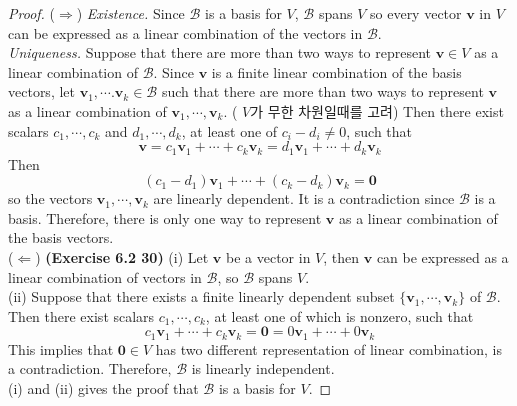 \begin{proof}
	($\Rightarrow$) \textit{Existence.} Since $\mathcal{B}$ is a basis for $V$, $\mathcal{B}$ spans $V$ so every vector $\textbf{v}$ in $V$ can be expressed as a linear combination of the vectors in $\mathcal{B}$. \\
	
	\textit{Uniqueness.} Suppose that there are more than two ways to represent $\textbf{v} \in V$ as a linear combination of $\mathcal{B}$. Since $\textbf{v}$ is a finite linear combination of the basis vectors, let $\textbf{v}_1, \cdots. \textbf{v}_k \in \mathcal{B}$ such that there are more than two ways to represent $\textbf{v}$ as a linear combination of $\textbf{v}_1, \cdots, \textbf{v}_k$. ({\color{blue} $V$가 무한 차원일때를 고려}) Then there exist scalars $c_1, \cdots, c_k$ and $d_1, \cdots, d_k$, at least one of $c_i - d_i \neq 0$, such that \begin{equation*}
		\textbf{v} = c_1\textbf{v}_1 + \cdots + c_k\textbf{v}_k = d_1\textbf{v}_1 + \cdots + d_k\textbf{v}_k
	\end{equation*} Then \begin{equation*}
		(c_1 - d_1)\textbf{v}_1 + \cdots + (c_k - d_k)\textbf{v}_k = \textbf{0}
	\end{equation*} so the vectors $\textbf{v}_1, \cdots, \textbf{v}_k$ are linearly dependent. It is a contradiction since $\mathcal{B}$ is a basis. Therefore, there is only one way to represent $\textbf{v}$ as a linear combination of the basis vectors. \\
	
	($\Leftarrow$) \textbf{(Exercise 6.2 30)} (i) Let $\textbf{v}$ be a vector in $V$, then $\textbf{v}$ can be expressed as a linear combination of vectors in $\mathcal{B}$, so $\mathcal{B}$ spans $V$. \\
	
	(ii) Suppose that there exists a finite linearly dependent subset $\{ \textbf{v}_1, \cdots, \textbf{v}_k \}$ of $\mathcal{B}$. Then there exist scalars $c_1, \cdots, c_k$, at least one of which is nonzero, such that \begin{equation*}
		c_1\textbf{v}_1 + \cdots + c_k\textbf{v}_k = \textbf{0} = 0\textbf{v}_1 + \cdots + 0\textbf{v}_k
	\end{equation*} This implies that $\textbf{0} \in V$ has two different representation of linear combination, is a contradiction. Therefore, $\mathcal{B}$ is linearly independent. \\
	
	(i) and (ii) gives the proof that $\mathcal{B}$ is a basis for $V$.
\end{proof}

